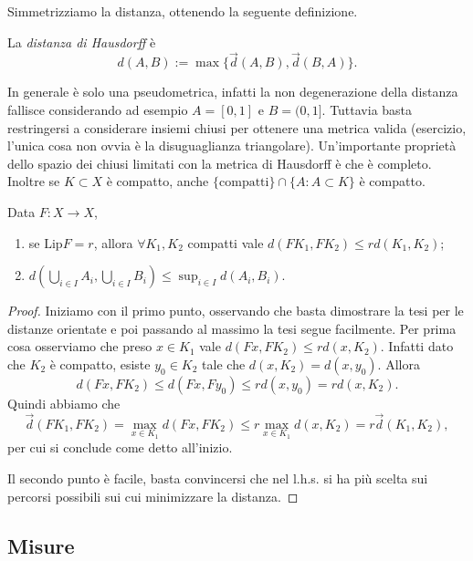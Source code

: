 	Simmetrizziamo la distanza, ottenendo la seguente definizione. 
\begin{definizione}
	La \emph{distanza di Hausdorff} è 
	$$d(A,B) := \max\{\vec d(A,B), \vec d(B,A)\}.$$
\end{definizione}

\begin{osservazione}
	In generale è solo una pseudometrica, infatti la non degenerazione della distanza fallisce considerando ad esempio $A = [0,1]$ e $B = (0,1]$. Tuttavia basta restringersi a considerare insiemi chiusi per ottenere una metrica valida (esercizio, l'unica cosa non ovvia è la disuguaglianza triangolare).
	Un'importante proprietà dello spazio dei chiusi limitati con la metrica di Hausdorff è che è completo. Inoltre se $K\subset X$ è compatto, anche $\{\text{compatti}\}\cap \{A:A\subset K\}$ è compatto. 
\end{osservazione}

\begin{prop}
	Data $F:X\to X$, 
	\begin{enumerate}
		\item se $\text{Lip}F = r$, allora $\forall K_{1},K_{2}$ compatti vale $d(FK_{1}, FK_{2})\leq rd(K_{1},K_{2})$;
		\item $d\left(\bigcup_{i\in I}A_{i}, \bigcup_{i\in I}B_{i}\right)\leq \sup_{i\in I}d(A_{i},B_{i})$.
	\end{enumerate}
\end{prop}
\begin{proof}
	Iniziamo con il primo punto, osservando che basta dimostrare la tesi per le distanze orientate e poi passando al massimo la tesi segue facilmente. 
	Per prima cosa osserviamo che preso $x\in K_{1}$ vale $d(Fx, FK_{2})\leq r d(x,K_{2})$. Infatti dato che $K_{2}$ è compatto, esiste $y_{0}\in K_{2}$ tale che $d(x,K_{2}) = d(x,y_{0})$. Allora
	$$d(Fx,FK_{2})\leq d(Fx, Fy_{0})\leq rd(x,y_{0}) = rd(x,K_{2}).$$
	Quindi abbiamo che 
	$$\vec d(FK_{1},FK_{2}) = \max_{x\in K_{1}}d(Fx,FK_{2}) \leq r\max_{x\in K_{1}}d(x,K_{2}) = r\vec d(K_{1},K_{2}),$$
	per cui si conclude come detto all'inizio. 
	
	Il secondo punto è facile, basta convincersi che nel l.h.s. si ha più scelta sui percorsi possibili sui cui minimizzare la distanza. 
\end{proof}


\subsection{Misure}

